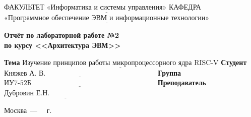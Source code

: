 \begin{titlepage}
	
	\noindent ФАКУЛЬТЕТ $\underline{\text{«Информатика и системы управления»}}$ \newline\newline
	\noindent КАФЕДРА $\underline{\text{«Программное обеспечение ЭВМ и информационные технологии»}}$\newline\newline\newline\newline\newline\newline\newline
	
	\vspace{\baselineskip}
	
	\begin{center}
		\noindent\begin{minipage}{0.81\textwidth}\centering
			\Large\textbf{Отчёт по лабораторной работе №2\\по курсу <<Архитектура ЭВМ>>}\newline\newline
		\end{minipage}
	\end{center}
	
	\noindent\textbf{Тема} $\underline{\text{Изучение принципов работы микропроцессорного ядра RISC-V}}$\newline\newline\newline
	\noindent\textbf{Студент} $\underline{\text{Княжев А. В.~~~~~~~~~~~~~~~~~~~~~~~~~~~~~~~~~~~~~~~~~~~~~~~}}$\newline\newline
	\noindent\textbf{Группа} $\underline{\text{ИУ7-52Б~~~~~~~~~~~~~~~~~~~~~~~~~~~~~~~~~~~~~~~~~~~~~~~~~~~~~}}$\newline\newline
	\noindent\textbf{Преподаватель} $\underline{\text{Дубровин Е.Н.~~~~~~~~~~~~~~~~~~~~~~~~~~~~~~~~~}}$\newline
	
	\begin{center}
		\vfill
		Москва~---~\the\year
		~г.
	\end{center}
	\restoregeometry
\end{titlepage}

